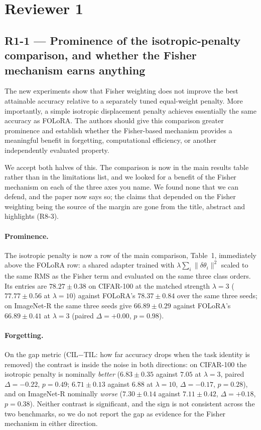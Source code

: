 \section{Reviewer 1}

\subsection*{R1-1 --- Prominence of the isotropic-penalty comparison, and whether the Fisher mechanism earns anything}

\begin{rquote}
The new experiments show that Fisher weighting does not improve the best attainable accuracy
relative to a separately tuned equal-weight penalty. More importantly, a simple isotropic
displacement penalty achieves essentially the same accuracy as FOLoRA. The authors should
give this comparison greater prominence and establish whether the Fisher-based mechanism
provides a meaningful benefit in forgetting, computational efficiency, or another
independently evaluated property.
\end{rquote}

\resp We accept both halves of this. The comparison is now in the main results table rather
than in the limitations list, and we looked for a benefit of the Fisher mechanism on each of
the three axes you name. We found none that we can defend, and the paper now says so; the
claims that depended on the Fisher weighting being the source of the margin are gone from the
title, abstract and highlights (R8-3).

\paragraph{Prominence.} The isotropic penalty is now a row of the main comparison,
Table~1, immediately above the FOLoRA row: a shared adapter trained with
$\lambda\sum_i\lVert\delta\theta_i\rVert^2$ scaled to the same RMS as the Fisher term and
evaluated on the same three class orders. Its entries are $78.27\pm0.38$ on CIFAR-100 at the
matched strength $\lambda{=}3$ ($77.77\pm0.56$ at $\lambda{=}10$) against FOLoRA's
$78.37\pm0.84$ over the same three seeds; on ImageNet-R the same three seeds give
$66.89\pm0.29$ against FOLoRA's $66.89\pm0.41$ at $\lambda{=}3$ (paired $\Delta{=}+0.00$,
$p{=}0.98$).

\paragraph{Forgetting.} On the gap metric (CIL$-$TIL: how far accuracy drops when the task
identity is removed) the contrast is inside the noise in both directions: on CIFAR-100 the
isotropic penalty is nominally \emph{better} ($6.83\pm0.35$ against $7.05$ at
$\lambda{=}3$, paired $\Delta{=}-0.22$, $p{=}0.49$; $6.71\pm0.13$ against $6.88$ at
$\lambda{=}10$, $\Delta{=}-0.17$, $p{=}0.28$), and on ImageNet-R nominally \emph{worse}
($7.30\pm0.14$ against $7.11\pm0.42$, $\Delta{=}+0.18$, $p{=}0.38$). Neither contrast is
significant, and the sign is not consistent across the two benchmarks, so we do not report the
gap as evidence for the Fisher mechanism in either direction.

